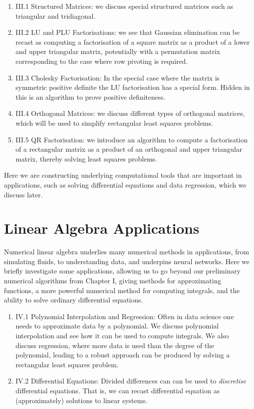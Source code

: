 \documentclass[12pt,a4paper]{book}
\theoremstyle{definition}
\begin{document}
\begin{enumerate}
    \item III.1 Structured Matrices: we discuss special structured matrices such as triangular and tridiagonal.
    \item III.2 LU and PLU Factorisations: we see that Gaussian elimination can be recast as computing a factorisation of a square matrix as a product of a lower and upper triangular matrix, potentially with a permutation matrix
    corresponding to the case where row pivoting is required.
    \item III.3 Cholesky Factorisation: In the special case where the matrix is symmetric positive
    definite the LU factorisation has a special form. Hidden in this is an algorithm to prove positive definiteness.
\item III.4 Orthogonal Matrices: we discuss different types of orthogonal matrices, which will be used to simplify rectangular least squares problems.
\item III.5 QR Factorisation: we introduce an algorithm to compute a factorisation of a rectangular matrix as a product of an orthogonal and upper triangular matrix, thereby solving least squares problems.
\end{enumerate}

Here we are constructing underlying computational tools that are important in applications, such as solving differential equations and data regression, which we discuss later.









\chapter{Linear Algebra Applications}

Numerical linear algebra underlies many numerical methods in applications, from simulating fluids, to understanding data,
and underpins neural networks. Here we briefly investigate some applications, allowing us to go beyond our preliminary numerical algorithms from Chapter I,
giving methods for approximating functions, a more powerful numerical method for computing integrals, and the ability to solve ordinary differential equations.

\begin{enumerate}
\item IV.1 Polynomial Interpolation and Regression: Often in data science one needs to approximate data by a polynomial.
We discuss polynomial interpolation and see how it can be used to compute integrals. We also discuss regression, where more data is used than the degree of the polynomial,
leading to a robust approach can be produced by solving a rectangular least squares problem.
\item IV.2 Differential Equations: Divided differences can can be used to {\it discretise} differential equations. That is, we can recast differential equation
as (approximately) solutions to linear systems. 
\end{enumerate}
\end{document}
